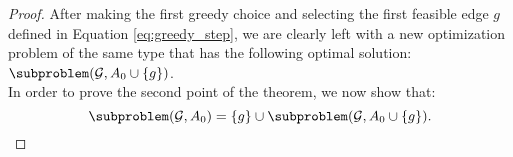 \begin{proof}
After making the first greedy choice and selecting the first feasible edge $g$ defined in Equation \ref{eq:greedy_step}, we are clearly left with a new optimization problem of the same type that has the following optimal solution: $\subproblem(\mathcal{G},A_0 \cup \{g\})$. \\
In order to prove the second point of the theorem, we now show that:
\begin{equation}\label{eq:optimal_sub}
\subproblem(\mathcal{G},A_0) = \{g\} \cup \subproblem(\mathcal{G},A_0 \cup \{g\}).
\end{equation}


\end{proof}
